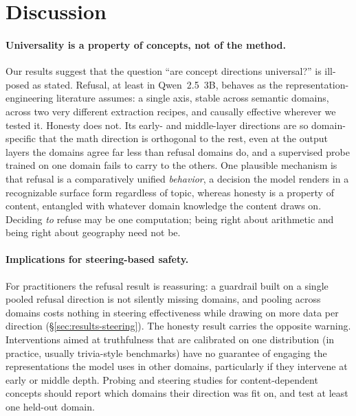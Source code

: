 \documentclass[11pt]{article}
\begin{document}
\section{Discussion}
\label{sec:discussion}

\paragraph{Universality is a property of concepts, not of the method.}
Our results suggest that the question ``are concept
directions universal?'' is ill-posed as stated. Refusal, at least in
Qwen~2.5~3B, behaves as the representation-engineering literature assumes: a
single axis, stable across semantic domains, across two very different
extraction recipes, and causally effective wherever we tested it. Honesty
does not. Its early- and middle-layer directions are so domain-specific that
the math direction is orthogonal to the rest, even at the output layers the
domains agree far less than refusal domains do, and a supervised probe
trained on one domain fails to carry to the others. One plausible mechanism
is that refusal is a comparatively unified \emph{behavior}, a decision the
model renders in a recognizable surface form regardless of topic, whereas
honesty is a property of content, entangled with whatever domain knowledge
the content draws on. Deciding \emph{to} refuse may be one computation;
being right about arithmetic and being right about geography need not be.

\paragraph{Implications for steering-based safety.}
For practitioners the refusal result is reassuring: a guardrail built on a
single pooled refusal direction is not silently missing domains, and pooling
across domains costs nothing in steering effectiveness while drawing on more
data per direction (\S\ref{sec:results-steering}). The
honesty result carries the opposite warning. Interventions aimed at
truthfulness that are calibrated on one distribution (in practice, usually
trivia-style benchmarks) have no guarantee of engaging the
representations the model uses in other domains, particularly if they
intervene at early or middle depth. Probing and steering studies for
content-dependent concepts should report which domains their direction was
fit on, and test at least one held-out domain.
\end{document}
